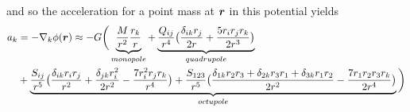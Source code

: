 and so the acceleration for a point mass at $\boldsymbol{r}$ in this potential yields
\begin{align}
\label{eq:mpacc}
a_{k} &= - \nabla_{k} \phi(\boldsymbol{r}) \approx - G \bigg(
\underbrace{ \frac{M}{r^{2}} \frac{r_{k}}{r} }_{monopole}+ 
\underbrace{ \frac{Q_{i j}}{r^{4}}
\big( \frac{\delta_{i k} r_{j} }{2r} + \frac{5 r_{i} r_{j} r_{k} }{2r^{3}} \big)
}_{quadrupole} \nonumber \\
&+ \underbrace{ \frac{S_{i j}}{r^{5}}
\big( \frac{ \delta_{i k} r_{i} r_{j} }{r^{2}}
+ \frac{ \delta_{j k} r_{i}^{2} }{2 r^{2} }
- \frac{7 r_{i}^{2} r_{j} r_{k} }{r^{4} } \big) 
 + \frac{S_{1 2 3}}{r^{5} }
\big( \frac{\delta_{1 k} r_{2} r_{3} + \delta_{2 k} r_{3} r_{1} + \delta_{3 k} r_{1} r_{2}}{2 r^{2}} 
- \frac{7 r_{1} r_{2} r_{3} r_{k} }{2 r^{4}}\big) 
}_{octupole}
\bigg)
\end{align}

